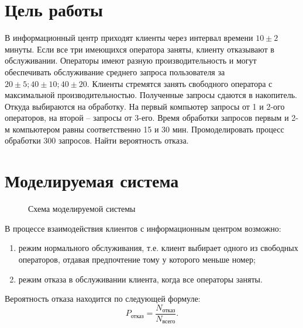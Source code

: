 \section*{Цель работы}

В информационный центр приходят клиенты через интервал времени $10 \pm 2$
минуты. Если все три имеющихся оператора заняты, клиенту отказывают в
обслуживании. Операторы имеют разную производительность и могут обеспечивать
обслуживание среднего запроса пользователя за $20 \pm 5; 40 \pm 10; 40 \pm 20.$
Клиенты стремятся занять свободного оператора с максимальной
производительностью. Полученные запросы сдаются в накопитель. Откуда выбираются
на обработку. На первый компьютер запросы от 1 и 2-ого операторов, на второй --
запросы от 3-его. Время обработки запросов первым и 2-м компьютером равны
соответственно 15 и 30 мин. Промоделировать процесс обработки 300 запросов.
Найти вероятность отказа. 

\section*{Моделируемая система}

\begin{figure}[h]
    \centering
    \def\svgwidth{\textwidth}
    
    \caption{Схема моделируемой системы}
\end{figure}

В процессе взаимодействия клиентов с информационным центром возможно:
\begin{enumerate}[leftmargin=\parindent]
    \item режим нормального обслуживания, т.е. клиент выбирает одного из
          свободных операторов, отдавая предпочтение тому у которого меньше
          номер;
    \item режим отказа в обслуживании клиента, когда все операторы заняты.
\end{enumerate}

Вероятность отказа находится по следующей формуле:
\begin{equation*}
    P_\text{отказ} = \frac{N_\text{отказ}}{N_\text{всего}}.
\end{equation*}

